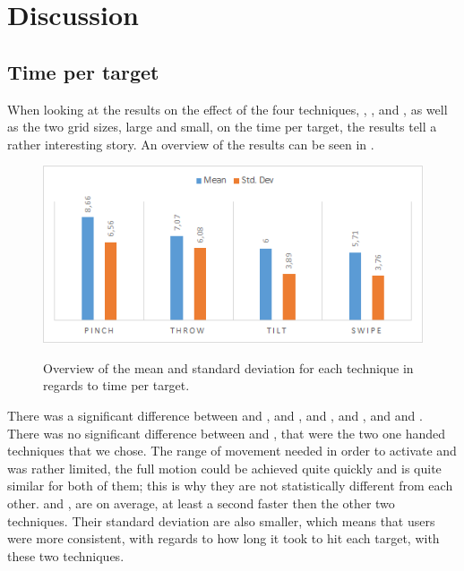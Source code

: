 \section{Discussion}
\label{sec:discussion}
\subsection{Time per target}
When looking at the results on the effect of the four techniques, \pinch, \tilt, \swipe and \throw, as well as the two grid sizes, large and small, on the time per target, the results tell a rather interesting story. An overview of the results can be seen in .

\begin{figure}[H]
	{\includegraphics[width = 1\columnwidth ]{images/timeResults.png}} 
	\caption{
		Overview of the mean and standard deviation for each technique in regards to time per target.
	}
	\label{fig:timeResults}
\end{figure}

There was a significant difference between \swipe and \throw, \swipe and \pinch, \tilt and \throw, \tilt and \pinch, and \throw and \pinch. There was no significant difference between \swipe and \tilt, that were the two one handed techniques that we chose. The range of movement needed in order to activate \swipe and \tilt was rather limited, the full motion could be achieved quite quickly and is quite similar for both of them; this is why they are not statistically different from each other. \swipe and \tilt, are on average, at least a second faster then the other two techniques. Their standard deviation are also smaller, which means that users were more consistent, with regards to how long it took to hit each target, with these two techniques. 


